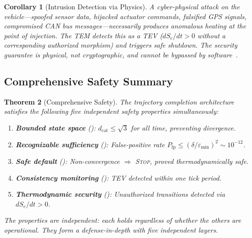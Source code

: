 \documentclass[twocolumn,10pt]{article}
\newtheorem{theorem}{Theorem}[section]
\newtheorem{corollary}[theorem]{Corollary}
\theoremstyle{definition}
\newcommand{\Se}{S_e}
\newcommand{\dcat}{d_{\mathrm{cat}}}
\begin{document}
\begin{corollary}[Intrusion Detection via Physics]
\label{cor:intrusion-detection}
A cyber-physical attack on the vehicle---spoofed sensor data, hijacked actuator commands, falsified GPS signals, compromised CAN bus messages---necessarily produces anomalous heating at the point of injection. The TEM detects this as a TEV ($d\Se/dt > 0$ without a corresponding authorized morphism) and triggers safe shutdown. The security guarantee is physical, not cryptographic, and cannot be bypassed by software~\cite{szilard1929,leff1990}.
\end{corollary}

\subsection{Comprehensive Safety Summary}

\begin{theorem}[Comprehensive Safety]
\label{thm:comprehensive-safety}
The trajectory completion architecture satisfies the following five independent safety properties simultaneously:
\begin{enumerate}
\item \textbf{Bounded state space} (): $\dcat \leq \sqrt{3}$ for all time, preventing divergence.
\item \textbf{Recognizable sufficiency} (): False-positive rate $P_{\mathrm{fp}} \leq (\delta/\varepsilon_{\min})^2 \sim 10^{-12}$.
\item \textbf{Safe default} (): Non-convergence $\Rightarrow$ \textsc{Stop}, proved thermodynamically safe.
\item \textbf{Consistency monitoring} (): TEV detected within one tick period.
\item \textbf{Thermodynamic security} (): Unauthorized transitions detected via $d\Se/dt > 0$.
\end{enumerate}
The properties are independent: each holds regardless of whether the others are operational. They form a defense-in-depth with five independent layers.
\end{theorem}
\end{document}
